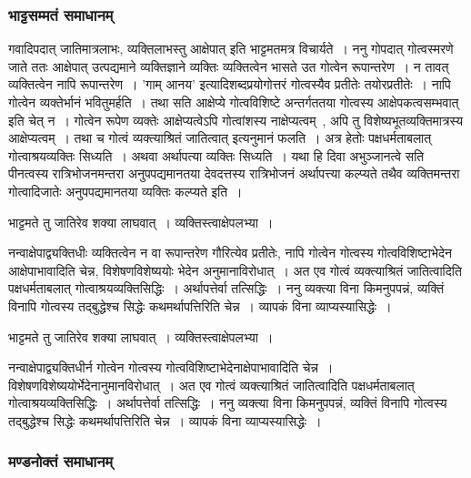 			\subsubsection{भाट्टसम्मतं समाधानम्}
				
				गवादिपदात् जातिमात्रलाभः, व्यक्तिलाभस्तु आक्षेपात् इति भाट्टमतमत्र विचार्यते~। ननु गोपदात् गोत्वस्मरणे जाते ततः आक्षेपात् उत्पद्यमाने व्यक्तिज्ञाने व्यक्तिः व्यक्तित्वेन भासते उत गोत्वेन रूपान्तरेण~। न तावत् व्यक्तित्वेन नापि रूपान्तरेण~। 'गाम् आनय' इत्यादिशब्दप्रयोगोत्तरं गोत्वस्यैव प्रतीतेः तयोरप्रतीतेः~। नापि गोत्वेन व्यक्तेर्भानं भवितुमर्हति~। तथा सति आक्षेप्ये गोत्वविशिष्टे अन्तर्गततया गोत्वस्य आक्षेपकत्वसम्भवात् इति चेत् न~। गोत्वेन रूपेण व्यक्तेः आक्षेप्यत्वेऽपि गोत्वांशस्य नाक्षेप्यत्वम्~, अपि तु विशेष्यभूतव्यक्तिमात्रस्य आक्षेप्यत्वम्~। तथा च गोत्वं व्यक्त्याश्रितं जातित्वात् इत्यनुमानं फलति~। अत्र हेतोः पक्षधर्मताबलात् गोत्वाश्रयव्यक्तिः सिध्यति~। अथवा अर्थापत्या व्यक्तिः सिध्यति~। यथा हि दिवा अभुञ्जानत्वे सति पीनत्वस्य रात्रिभोजनमन्तरा अनुपपद्यमानतया देवदत्तस्य रात्रिभोजनं अर्थापत्त्या कल्प्यते तथैव व्यक्तिमन्तरा गोत्वादिजातेः अनुपपद्यमानतया व्यक्तिः कल्प्यते इति~। 

				\begin{small}

					भाट्टमते तु जातिरेव शक्या लाघवात्~। व्यक्तिस्त्वाक्षेपलभ्या~।
	
					नन्वाक्षेपाद्व्यक्तिधीः व्यक्तित्वेन न वा रूपान्तरेण गौरित्येव प्रतीतेः, नापि गोत्वेन गोत्वस्य गोत्वविशिष्टाभेदेन आक्षेपाभावादिति चेन्न, विशेषणविशेष्ययोः भेदेन अनुमानाविरोधात्~।  अत एव गोत्वं व्यक्त्याश्रितं जातित्वादिति पक्षधर्मताबलात् गोत्वाश्रयव्यक्तिसिद्धिः~। अर्थापत्तेर्वा तत्सिद्धिः~। ननु व्यक्त्या विना किमनुपपन्नं, व्यक्तिं विनापि गोत्वस्य तद्बुद्धेश्च सिद्धेः कथमर्थापत्तिरिति चेन्न~। व्यापकं विना व्याप्यस्यासिद्धेः~।

					भाट्टमते तु जातिरेव शक्या लाघवात्~। व्यक्तिस्त्वाक्षेपलभ्या~। 

					नन्वाक्षेपाद्व्यक्तिधीर्न गोत्वेन गोत्वस्य गोत्वविशिष्टाभेदेनाक्षेपाभावादिति चेन्न~। विशेषणविशेष्ययोर्भेदेनानुमानविरोधात्~। अत एव गोत्वं व्यक्त्याश्रितं जातित्वादिति पक्षधर्मताबलात् गोत्वाश्रयव्यक्तिसिद्धिः~। अर्थापत्तेर्वा तत्सिद्धिः~। ननु व्यक्त्या विना किमनुपपन्नं, व्यक्तिं विनापि गोत्वस्य तद्बुद्धेश्च सिद्धेः कथमर्थापत्तिरिति चेन्न~। व्यापकं विना व्याप्यस्यासिद्धेः~। 
				\end{small}

			\subsubsection{मण्डनोक्तं समाधानम्} 

